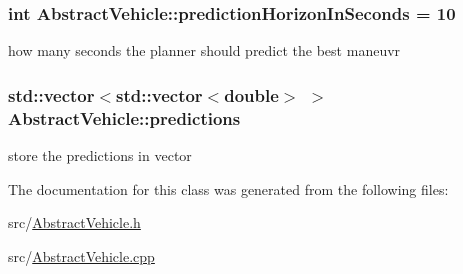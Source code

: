 \subsubsection[{\texorpdfstring{prediction\+Horizon\+In\+Seconds}{predictionHorizonInSeconds}}]{\setlength{\rightskip}{0pt plus 5cm}int Abstract\+Vehicle\+::prediction\+Horizon\+In\+Seconds = 10\hspace{0.3cm}{\ttfamily [protected]}}\hypertarget{classAbstractVehicle_ae24b37395a3fa832a82b6460a127378b}{}\label{classAbstractVehicle_ae24b37395a3fa832a82b6460a127378b}
how many seconds the planner should predict the best maneuvr 
\subsubsection[{\texorpdfstring{predictions}{predictions}}]{\setlength{\rightskip}{0pt plus 5cm}std\+::vector$<$std\+::vector$<$double$>$ $>$ Abstract\+Vehicle\+::predictions\hspace{0.3cm}{\ttfamily [protected]}}\hypertarget{classAbstractVehicle_a72ef849b0da369f2eb74ca091b1e00b7}{}\label{classAbstractVehicle_a72ef849b0da369f2eb74ca091b1e00b7}
store the predictions in vector 

The documentation for this class was generated from the following files\+:\begin{DoxyCompactItemize}
\item 
src/\hyperlink{AbstractVehicle_8h}{Abstract\+Vehicle.\+h}\item 
src/\hyperlink{AbstractVehicle_8cpp}{Abstract\+Vehicle.\+cpp}\end{DoxyCompactItemize}
